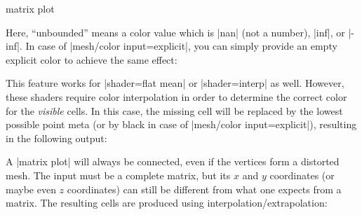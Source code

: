 {\begin{plottype}[/pgfplots]{matrix plot}
\begin{codeexample}[]
\end{codeexample}
	Here, ``unbounded'' means a color value which is |nan| (not a number), |inf|, or |-inf|. In case of |mesh/color input=explicit|, you can simply provide an empty explicit color to achieve the same effect:
\begin{codeexample}[]
\end{codeexample}
	This feature works for |shader=flat mean| or |shader=interp| as well. However, these shaders require color interpolation in order to determine the correct color for the \emph{visible} cells. In this case, the missing cell will be replaced by the lowest possible point meta (or by black in case of |mesh/color input=explicit|), resulting in the following output:
\begin{codeexample}[]
\end{codeexample}

    A |matrix plot| will always be connected, even if the vertices form a distorted mesh. The input must be a complete matrix, but its $x$ and $y$ coordinates (or maybe even $z$ coordinates) can still be different from what one expects from a matrix. The resulting cells are produced using interpolation/extrapolation:
\begin{codeexample}[]
\begin{tikzpicture}
	\begin{axis}[enlargelimits=0.2,colorbar]


\end{axis}
\end{tikzpicture}
\end{codeexample}
\end{plottype}}

